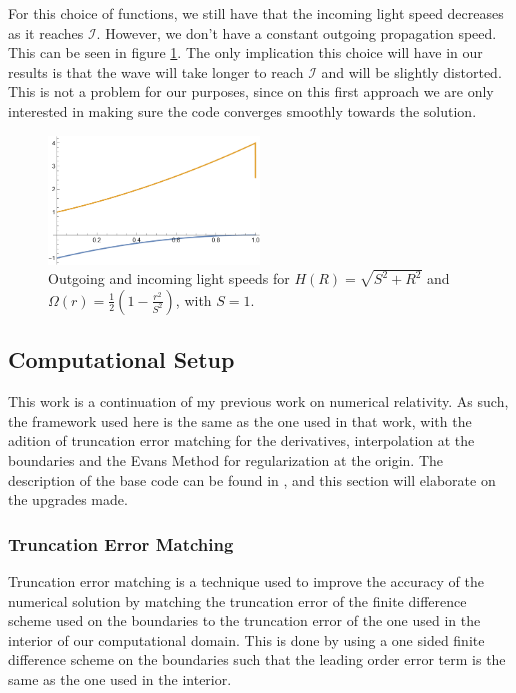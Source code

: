 For this choice of functions, we still have that the incoming light speed decreases as it reaches $\mathscr{I}$. However, we don't have a constant outgoing propagation speed. This can be seen in figure \ref{fig:Bad_Speeds}. The only implication this choice will have in our results is that the wave will take longer to reach $\mathscr{I}$ and will be slightly distorted. This is not a problem for our purposes, since on this first approach we are only interested in making sure the code converges smoothly towards the solution.

\begin{figure}[h]
    \centering
    \includegraphics[width=0.5\textwidth]{Images/Bad_Speeds.png}
    \caption{Outgoing and incoming light speeds for $H(R) = \sqrt{S^2+R^2}$ and $\Omega(r) = \frac{1}{2} \left(1 - \frac{r^2}{S^2}\right)$, with $S = 1$.}
    \label{fig:Bad_Speeds}
\end{figure}

\subsection{Computational Setup}

This work is a continuation of my previous work on numerical relativity. As such, the framework used here is the same as the one used in that work, with the adition of truncation error matching for the derivatives, interpolation at the boundaries and the Evans Method for regularization at the origin. The description of the base code can be found in \cite{}, and this section will elaborate on the upgrades made.

\subsubsection{Truncation Error Matching}

Truncation error matching is a technique used to improve the accuracy of the numerical solution by matching the truncation error of the finite difference scheme used on the boundaries to the truncation error of the one used in the interior of our computational domain. This is done by using a one sided finite difference scheme on the boundaries such that the leading order error term is the same as the one used in the interior.

